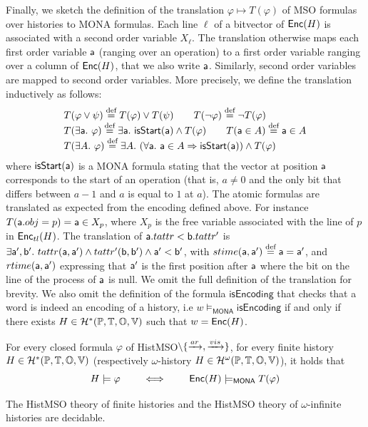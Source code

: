 Finally, we sketch the definition of the translation $\varphi\mapsto T(\varphi)$
of MSO formulas over histories to MONA formulas. Each line $\ell$ 
of a bitvector of $\mathsf{Enc}(H)$ is associated with a second order variable $X_{\ell}$.
The translation otherwise maps each first order variable $\mathsf{a}$ (ranging over an operation) to a first order variable ranging over a column of $\mathsf{Enc}(H)$, that we also write $\mathsf{a}$. Similarly, second order variables are mapped to second order variables.
More precisely, we define the translation inductively as follows:
$$
\begin{array}{l}
T(\varphi\vee\psi) \eqdef T(\varphi) \vee T(\psi) 
\qquad
T(\neg\varphi) \eqdef \neg T(\varphi) 
\\
T(\exists \varopa.\ \varphi) \eqdef \exists \varopa.\ \mathsf{isStart}(\varopa)\wedge T(\varphi)
\qquad
T(\varopa\in A) \eqdef \varopa \in A
\\
T(\exists A.\ \varphi) \eqdef \exists A.\ (\forall \varopa.\ \varopa\in A\Rightarrow \mathsf{isStart}(\varopa))\wedge T(\varphi)
\end{array}
$$
where $\mathsf{isStart}(\mathsf{a})$ is a MONA formula stating that the vector at position $\mathsf{a}$ corresponds to the start of an operation (that is, $a\neq 0$ and the only bit that differs between $a-1$ and $a$ is equal to $1$ at $a$).
The atomic formulas are translated as expected from the encoding defined above. For instance $T(\mathsf{a}.obj=p)= \mathsf{a} \in X_p$, where $X_p$ is the free variable associated with the line of $p$ in $\mathsf{Enc}_{tl}(H)$. The translation of $\mathsf{a}.tattr<\mathsf{b}.tattr'$ is $\exists \varopa',\varopb'.\ tattr(\varopa,\varopa')\wedge tattr'(\varopb,\varopb')\wedge \varopa'<\varopb'$, with
$stime(\mathsf{a},\mathsf{a}')\stackrel{\text{def}}{=} \mathsf{a}=\mathsf{a}'$,
and $rtime(\mathsf{a},\mathsf{a}')$ expressing that $\mathsf{a}'$ is the first position 
after $\mathsf{a}$ where the bit on the line of the process of $\mathsf{a}$ is null. We omit the full definition of the translation for brevity. We also omit the definition of the formula $\mathsf{isEncoding}$ that checks that a word is indeed an encoding of a history, i.e $w\models_{\mathsf{MONA}} \mathsf{isEncoding}$ if and only if there exists $H\in\mathcal{H}^*(\mathbb{P}, \mathbb{T}, \mathbb{O}, \mathbb{V})$ such that $w=\mathsf{Enc}(H)$.

\begin{theorem}
  For every closed formula $\varphi$ of HistMSO$\setminus\{\xrightarrow{ar},\xrightarrow{vis}\}$, for every finite history $H\in\mathcal{H}^*(\mathbb{P}, \mathbb{T}, \mathbb{O}, \mathbb{V})$ (respectively $\omega$-history $H\in\mathcal{H}^\omega(\mathbb{P}, \mathbb{T}, \mathbb{O}, \mathbb{V})$), it holds that
  $$
    H \models \varphi \qquad \iff \qquad \mathsf{Enc}(H) \models_{\mathsf{MONA}} T(\varphi)
  $$
\end{theorem}
\begin{corollary}
  The HistMSO theory of finite histories and the HistMSO theory of $\omega$-infinite histories are decidable.
\end{corollary}

